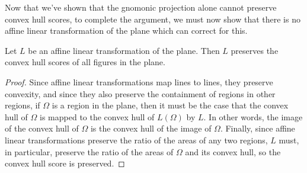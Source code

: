 Now that we've shown that the gnomonic projection alone cannot
preserve convex hull scores, to complete the argument, we must now
show that there is no affine linear transformation of the plane which
can correct for this.

\begin{lemma}\label{lem:noafflin}
	Let $L$ be an affine linear transformation of the plane.  Then $L$
	preserves the convex hull scores of all figures in the plane.
\end{lemma}
\begin{proof}
	Since affine linear transformations map lines to lines, they preserve
	convexity, and since they also preserve the containment of regions in
	other regions, if $\Omega$ is a region in the plane, then it must be
	the case that the convex hull of $\Omega$ is mapped to the convex hull
	of $L(\Omega)$ by $L$.  In other words, the image of the convex hull
	of $\Omega$ is the convex hull of the image of $\Omega$.  Finally,
	since affine linear transformations preserve the ratio of the areas of
	any two regions, $L$ must, in particular, preserve the ratio of the
	areas of $\Omega$ and its convex hull, so the convex hull score is
	preserved.
\end{proof}
